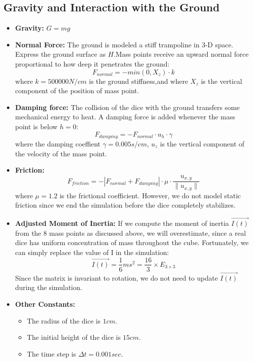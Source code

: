 \documentclass[12pt]{article}
\begin{document}
\subsection{Gravity and Interaction with the Ground}
\begin{itemize}
  \item \textbf{Gravity:} $G=mg$
  \item \textbf{Normal Force:} The ground is modeled a stiff trampoline in 3-D space. Express the ground surface as $H$.Mass points receive an upward normal force proportional to how deep it penetrates the ground:\\
\begin{equation}
F_{normal}=-min(0,X_{z})\cdot k
\end{equation}
       where $k=500000 N/cm$ is the ground stiffness,and where $X_{z}$ is the vertical component of the position of mass point.\\
  \item \textbf{Damping force:} The collision of the dice with the ground transfers some mechanical energy to heat. A damping force is added whenever the mass point is below $h=0$:\\
\begin{equation}
F_{damping}=-F_{normal}\cdot u_{h}\cdot \gamma
\end{equation}
where the damping coeffient $\gamma=0.005 s/cm$, $u_{z}$ is the vertical component of the velocity of the mass point.\\
  \item \textbf{Friction:} 
\begin{equation}
F_{friction}=-|F_{normal}+F_{damping}|\cdot \mu \cdot \frac{u_{x,y}}{\lVert{u_{x,y}}\rVert}
\end{equation}
where $\mu=1.2$ is the frictional coefficient. However, we do not model static friction since we end the simulation before the dice completely stabilizes. 
  \item \textbf{Adjusted Moment of Inertia:} If we compute the moment of inertia $\vec{I(t)}$ from the 8 mass points as discussed above, we will overestimate, since a real dice has uniform concentration of mass throughout the cube. Fortunately, we can simply replace the value of I in the simulation:\\
\begin{equation}
\vec{I(t)}=\frac{1}{6}ms^{2}=\frac{16}{3}\times E_{3\times3}
\end{equation}
Since the matrix is invariant to rotation, we do not need to update $\vec{I(t)}$ during the simulation. 
  \item \textbf{Other Constants:} 
\begin{itemize}
  \item The radius of the dice is $1 cm$. 
  \item The initial height of the dice is $15 cm$. 
  \item The time step is $\Delta{t}=0.001 sec$. 
\end{itemize}
\end{itemize}
\end{document}

